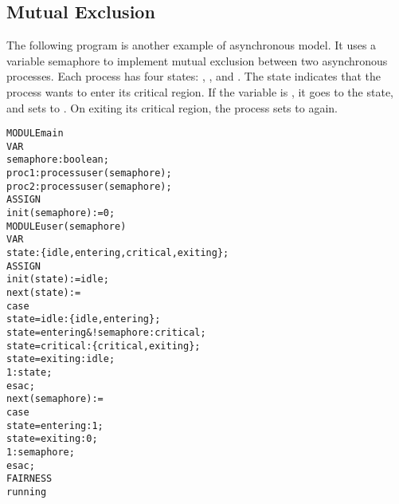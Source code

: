 

\subsection{Mutual Exclusion}
\label{Semaphore}

The following program is another example of asynchronous
model. It uses a variable semaphore to implement mutual exclusion
between two asynchronous processes.  Each process has four states:
, ,  and . The
 state indicates that the process wants to enter its
critical region. If the variable  is , it goes
to the  state, and sets  to . On
exiting its critical region, the process sets  to
 again.\\
\begin{alltt}
MODULE main
 VAR
   semaphore : boolean;
   proc1     : process user(semaphore);
   proc2     : process user(semaphore);
 ASSIGN
   init(semaphore) := 0;
MODULE user(semaphore)
 VAR
   state : \{idle, entering, critical, exiting\};
 ASSIGN
   init(state) := idle;
   next(state) :=
     case
       state = idle                  : \{idle, entering\};
       state = entering & !semaphore : critical;
       state = critical              : \{critical, exiting\};
       state = exiting               : idle;
       1                             : state;
     esac;
   next(semaphore) :=
     case
       state = entering : 1;
       state = exiting  : 0;
       1                : semaphore;
     esac;
 FAIRNESS
   running
\end{alltt}


